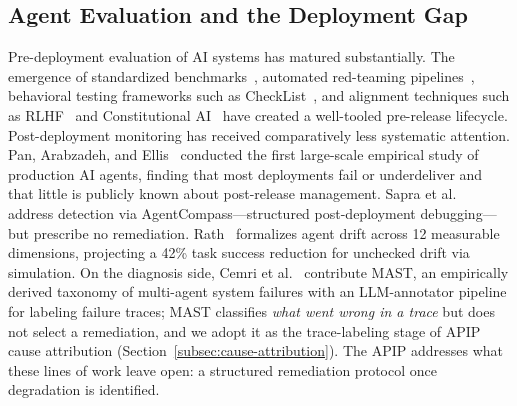 \documentclass[conference]{IEEEtran}
\begin{document}
\subsection{Agent Evaluation and the Deployment Gap}
\label{subsec:deployment-gap}

Pre-deployment evaluation of AI systems has matured substantially. The
emergence of standardized benchmarks~\cite{liang2022holistic}, automated
red-teaming pipelines~\cite{ganguli2022redteaming,perez2022redteaming},
behavioral testing frameworks such as CheckList~\cite{ribeiro2020checklist},
and alignment techniques such as RLHF~\cite{ouyang2022instructions} and
Constitutional AI~\cite{anthropic2023constitutional} have created a well-tooled
pre-release lifecycle. Post-deployment monitoring has received comparatively
less systematic attention. Pan, Arabzadeh, and Ellis~\cite{pan2025measuring}
conducted the first large-scale empirical study of production AI agents,
finding that most deployments fail or underdeliver and that little is publicly
known about post-release management. Sapra et al.~\cite{sapra2025agentcompass}
address detection via AgentCompass---structured post-deployment
debugging---but prescribe no remediation. Rath~\cite{rath2026drift} formalizes
agent drift across 12 measurable dimensions, projecting a 42\% task success
reduction for unchecked drift via simulation. On the diagnosis side, Cemri et
al.~\cite{cemri2025mast} contribute MAST, an empirically derived taxonomy of
multi-agent system failures with an LLM-annotator pipeline for labeling failure
traces; MAST classifies \emph{what went wrong in a trace} but does not select a
remediation, and we adopt it as the trace-labeling stage of APIP cause
attribution (Section~\ref{subsec:cause-attribution}). The APIP addresses what
these lines of work leave open: a structured remediation protocol once
degradation is identified.
\end{document}
